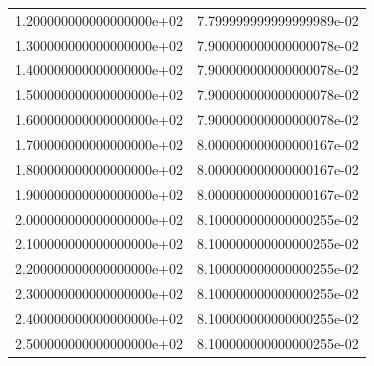 \begin{table}
\begin{tabular}{|S|S|}
    1.200000000000000000e+02 & 7.799999999999999989e-02\\
    1.300000000000000000e+02 & 7.900000000000000078e-02\\
    1.400000000000000000e+02 & 7.900000000000000078e-02\\
    1.500000000000000000e+02 & 7.900000000000000078e-02\\
    1.600000000000000000e+02 & 7.900000000000000078e-02\\
    1.700000000000000000e+02 & 8.000000000000000167e-02\\
    1.800000000000000000e+02 & 8.000000000000000167e-02\\
    1.900000000000000000e+02 & 8.000000000000000167e-02\\
    2.000000000000000000e+02 & 8.100000000000000255e-02\\
    2.100000000000000000e+02 & 8.100000000000000255e-02\\
    2.200000000000000000e+02 & 8.100000000000000255e-02\\
    2.300000000000000000e+02 & 8.100000000000000255e-02\\
    2.400000000000000000e+02 & 8.100000000000000255e-02\\
    2.500000000000000000e+02 & 8.100000000000000255e-02\\
    \bottomrule
  \end{tabular}
\end{table}

